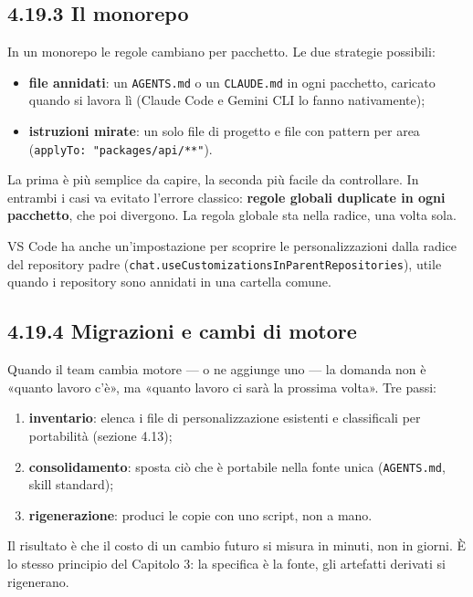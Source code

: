 \documentclass[
  italian,
  10pt,
]{book}
\providecommand{\tightlist}{%
  \setlength{\itemsep}{0pt}\setlength{\parskip}{0pt}}
\begin{document}
\subsection{4.19.3 Il monorepo}\label{il-monorepo}

In un monorepo le regole cambiano per pacchetto. Le due strategie
possibili:

\begin{itemize}
\tightlist
\item
  \textbf{file annidati}: un \texttt{AGENTS.md} o un \texttt{CLAUDE.md}
  in ogni pacchetto, caricato quando si lavora lì (Claude Code e Gemini
  CLI lo fanno nativamente);
\item
  \textbf{istruzioni mirate}: un solo file di progetto e file con
  pattern per area (\texttt{applyTo:\ "packages/api/**"}).
\end{itemize}

La prima è più semplice da capire, la seconda più facile da controllare.
In entrambi i casi va evitato l'errore classico: \textbf{regole globali
duplicate in ogni pacchetto}, che poi divergono. La regola globale sta
nella radice, una volta sola.

VS Code ha anche un'impostazione per scoprire le personalizzazioni dalla
radice del repository padre
(\texttt{chat.useCustomizationsInParentRepositories}), utile quando i
repository sono annidati in una cartella comune.

\subsection{4.19.4 Migrazioni e cambi di
motore}\label{migrazioni-e-cambi-di-motore}

Quando il team cambia motore --- o ne aggiunge uno --- la domanda non è
«quanto lavoro c'è», ma «quanto lavoro ci sarà la prossima volta». Tre
passi:

\begin{enumerate}
\def\labelenumi{\arabic{enumi}.}
\tightlist
\item
  \textbf{inventario}: elenca i file di personalizzazione esistenti e
  classificali per portabilità (sezione 4.13);
\item
  \textbf{consolidamento}: sposta ciò che è portabile nella fonte unica
  (\texttt{AGENTS.md}, skill standard);
\item
  \textbf{rigenerazione}: produci le copie con uno script, non a mano.
\end{enumerate}

Il risultato è che il costo di un cambio futuro si misura in minuti, non
in giorni. È lo stesso principio del Capitolo 3: la specifica è la
fonte, gli artefatti derivati si rigenerano.
\end{document}
